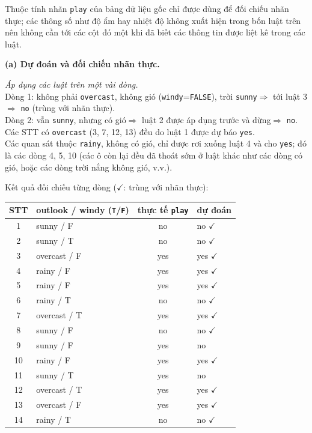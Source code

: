 Thuộc tính nhãn \texttt{play} của bảng dữ liệu gốc chỉ được dùng để đối chiếu nhãn thực; các thông số như độ ẩm hay nhiệt độ không xuất hiện trong bốn luật trên nên không cần tới các cột đó một khi đã biết các thông tin được liệt kê trong các luật.

\medskip
\textbf{(a) Dự đoán và đối chiếu nhãn thực.}

\vspace{2pt}\noindent\textit{Áp dụng các luật trên một vài dòng.}\\
Dòng 1: không phải \texttt{overcast}, không gió (\texttt{windy}=\texttt{FALSE}), trời \texttt{sunny}$ \Rightarrow $ tới luật 3$ \Rightarrow $ \texttt{no} (trùng với nhãn thực).\\
Dòng 2: vẫn \texttt{sunny}, nhưng có gió$ \Rightarrow $ luật 2 được áp dụng trước và dừng$ \Rightarrow $ \texttt{no}.\\
Các STT có \texttt{overcast} (3, 7, 12, 13) đều do luật 1 được dự báo \texttt{yes}.\\
Các quan sát thuộc \texttt{rainy}, không có gió, chỉ được rơi xuống luật 4 và cho \texttt{yes}; đó là các dòng 4, 5, 10 (các ô còn lại đều đã thoát sớm ở luật khác như các dòng có gió, hoặc các dòng trời nắng không gió, v.v.).

Kết quả đối chiếu từng dòng ($\checkmark$: trùng với nhãn thực):
\begin{center}
\footnotesize
\begin{tabular}{c l c l}
\toprule
STT & outlook / windy (\texttt{T}/\texttt{F}) & thực tế \texttt{play} & dự đoán \\
\midrule
1 & sunny / F & no & no $\checkmark$ \\
2 & sunny / T & no & no $\checkmark$ \\
3 & overcast / F & yes & yes $\checkmark$ \\
4 & rainy / F & yes & yes $\checkmark$ \\
5 & rainy / F & yes & yes $\checkmark$ \\
6 & rainy / T & no & no $\checkmark$ \\
7 & overcast / T & yes & yes $\checkmark$ \\
8 & sunny / F & no & no $\checkmark$ \\
9 & sunny / F & yes & no \\
10 & rainy / F & yes & yes $\checkmark$ \\
11 & sunny / T & yes & no \\
12 & overcast / T & yes & yes $\checkmark$ \\
13 & overcast / F & yes & yes $\checkmark$ \\
14 & rainy / T & no & no $\checkmark$ \\
\bottomrule
\end{tabular}
\end{center}

